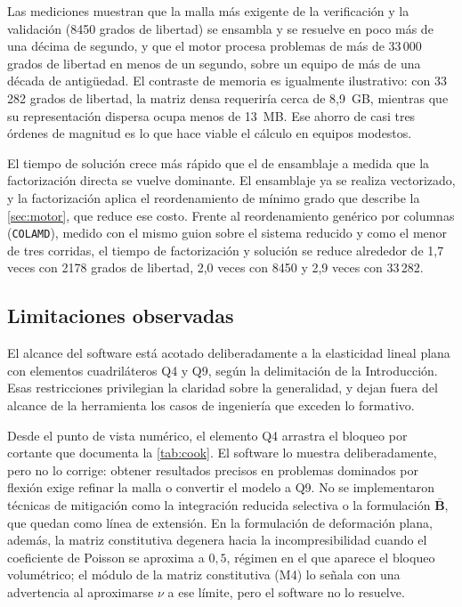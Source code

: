 Las mediciones muestran que la malla más exigente de la verificación y la validación (8450 grados de libertad) se ensambla y se resuelve en poco más de una décima de segundo, y que el motor procesa problemas de más de 33\,000 grados de libertad en menos de un segundo, sobre un equipo de más de una década de antigüedad. El contraste de memoria es igualmente ilustrativo: con 33\,282 grados de libertad, la matriz densa requeriría cerca de 8,9~GB, mientras que su representación dispersa ocupa menos de 13~MB. Ese ahorro de casi tres órdenes de magnitud es lo que hace viable el cálculo en equipos modestos.

El tiempo de solución crece más rápido que el de ensamblaje a medida que la factorización directa se vuelve dominante. El ensamblaje ya se realiza vectorizado, y la factorización aplica el reordenamiento de mínimo grado que describe la \autoref{sec:motor}, que reduce ese costo. Frente al reordenamiento genérico por columnas (\texttt{COLAMD}), medido con el mismo guion sobre el sistema reducido y como el menor de tres corridas, el tiempo de factorización y solución se reduce alrededor de 1,7 veces con 2178 grados de libertad, 2,0 veces con 8450 y 2,9 veces con 33\,282.

\subsection{Limitaciones observadas}
\label{sec:limitaciones-observadas}

El alcance del software está acotado deliberadamente a la elasticidad lineal plana con elementos cuadriláteros Q4 y Q9, según la delimitación de la Introducción. Esas restricciones privilegian la claridad sobre la generalidad, y dejan fuera del alcance de la herramienta los casos de ingeniería que exceden lo formativo.

Desde el punto de vista numérico, el elemento Q4 arrastra el bloqueo por cortante que documenta la \autoref{tab:cook}. El software lo muestra deliberadamente, pero no lo corrige: obtener resultados precisos en problemas dominados por flexión exige refinar la malla o convertir el modelo a Q9. No se implementaron técnicas de mitigación como la integración reducida selectiva o la formulación $\bar{\bm{B}}$, que quedan como línea de extensión. En la formulación de deformación plana, además, la matriz constitutiva degenera hacia la incompresibilidad cuando el coeficiente de Poisson se aproxima a $0{,}5$, régimen en el que aparece el bloqueo volumétrico; el módulo de la matriz constitutiva (M4) lo señala con una advertencia al aproximarse $\nu$ a ese límite, pero el software no lo resuelve.

